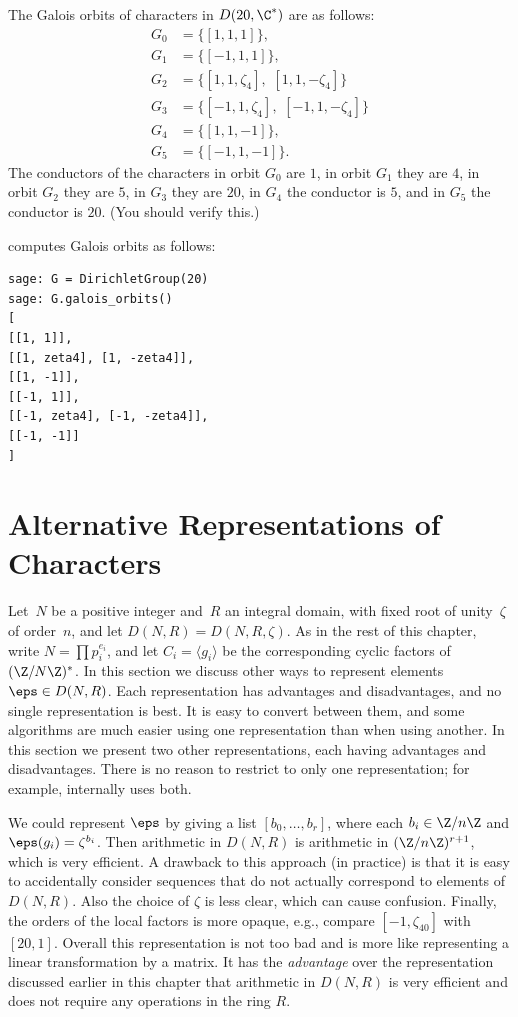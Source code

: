 \begin{example}
The Galois orbits of characters in $D(20,\C^*)$ are as follows:
\begin{align*}
  G_0 &= \{ [1,1,1]\},\\
  G_1 &= \{[-1,1,1]\}, \\
  G_2 &= \{[1,1,\zeta_4],\,\, [1,1,-\zeta_4]\}\\
  G_3 &= \{[-1,1,\zeta_4],\,\, [-1,1,-\zeta_4]\}\\  
  G_4 &= \{[1,1,-1]\}, \\
  G_5 &= \{[-1,1,-1]\}.
\end{align*}
The conductors of the characters in orbit $G_0$ are $1$, in
orbit $G_1$ they are $4$, in orbit $G_2$ they are $5$, in
$G_3$ they are $20$, in $G_4$ the conductor is $5$, 
and in $G_5$ the conductor is $20$. (You should verify this.)

\sage{} computes Galois orbits as follows:
\begin{verbatim}
sage: G = DirichletGroup(20)
sage: G.galois_orbits()
[
[[1, 1]],
[[1, zeta4], [1, -zeta4]],
[[1, -1]],
[[-1, 1]],
[[-1, zeta4], [-1, -zeta4]],
[[-1, -1]]
]
\end{verbatim}
\end{example}

\section{Alternative Representations of Characters}\label{sec:alter_rep}
Let~$N$ be a positive integer and~$R$ an integral domain, with fixed
root of unity~$\zeta$ of 
order~$n$, and let $D(N,R)=D(N,R,\zeta)$.  As in
the rest of this chapter, write $N=\prod p_i^{e_i}$, and let
$C_i=\langle g_i\rangle $ be the corresponding cyclic factors of
$(\Z/N\Z)^*$.  In this section we discuss other ways to represent
elements $\eps \in D(N,R)$.  Each representation has advantages and
disadvantages, and no single representation is best. 
It is easy to convert between them, and some algorithms are much
easier using one representation than when using another.  
In this section we present two other representations, each 
having advantages and disadvantages.  There
is no reason to restrict to only one representation; for example,
\sage{} internally uses both.


We could represent $\eps$ by giving a list $[b_0,\ldots, b_r]$, where
each $b_i\in\Z/n\Z$ and $\eps(g_i) = \zeta^{b_i}$.  Then arithmetic in
$D(N,R)$ is arithmetic in $(\Z/n\Z)^{r+1}$, which is very efficient.
A drawback to this approach (in practice) is that it is easy to
accidentally consider sequences that do not actually correspond to
elements of $D(N,R)$.  Also the choice of $\zeta$ is less clear, which
can cause confusion.  Finally, the orders of the local factors is more
opaque, e.g., compare $[-1,\zeta_{40}]$ with $[20,1]$.  Overall this
representation is not too bad and is more like representing a linear
transformation by a matrix.  It has the {\em advantage} over the
representation discussed earlier in this chapter that arithmetic in
$D(N,R)$ is very efficient and does not require any operations in the
ring $R$.

